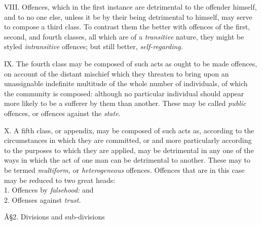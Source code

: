 \documentclass[12pt]{report}
\begin{document}
VIII. Offences, which in the first instance are detrimental to the
offender himself, and to no one else, unless it be by their being
detrimental to himself, may serve to compose a third class. To contrast
them the better with offences of the first, second, and fourth classes,
all which are of a \emph{transitive} nature, they might be styled
\emph{intransitive} offences; but still better, \emph{self-regarding.}

IX. The fourth class may be composed of such acts as ought to be made
offences, on account of the distant mischief which they threaten to
bring upon an unassignable indefinite multitude of the whole number of
individuals, of which the community is composed: although no particular
individual should appear more likely to be a sufferer by them than
another. These may be called \emph{public} offences, or offences against
the \emph{state.}

X. A fifth class, or appendix, may be composed of such acts as,
according to the circumstances in which they are committed, or and more
particularly according to the purposes to which they are applied, may be
detrimental in any one of the ways in which the act of one man can be
detrimental to another. These may to be termed \emph{multiform,} or
\emph{heterogeneous} offences. Offences that are in this case may be
reduced to two great heads:\\
1. Offences by \emph{falsehood:} and\\
2. Offenses against \emph{trust.}

Â§2. Divisions and sub-divisions
\end{document}
